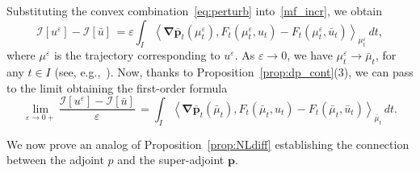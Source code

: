 \documentclass[sn-mathphys-num]{sn-jnl}
\numberwithin{equation}{section}
\theoremstyle{mythm}
\theoremstyle{mydef}
\renewcommand{\epsilon}{\varepsilon}
\renewcommand{\d}{\,d}
\renewcommand{\mathbf}[1]{\bm{#1}}
\begin{document}
Substituting the convex combination~\eqref{eq:perturb} into~\eqref{mf_incr}, we obtain 
\[
 \mathcal{I}[u^\epsilon] - \mathcal{I}[\bar{u}] \, = \epsilon \int_I \left< \bm \nabla \bar{\bm{p}} _t(\mu_t^\epsilon),F_t(\mu_t^\epsilon,u_t)-F_t(\mu_t^\epsilon,\bar{u}_{t})\right>_{\mu_t^\epsilon}\d t,
\]
where \( \mu^\epsilon \) is the trajectory corresponding to \( u^\epsilon \). As \( \epsilon\to 0 \), we have \( \mu^\epsilon_t\to \bar{\mu}_t \), for any \( t\in I \) (see, e.g.,~\cite{pogodaevNonlocalBalanceEquations2022}). 
Now, thanks to Proposition~\ref{prop:dp_cont}(3), we can pass to the limit obtaining the first-order formula
\begin{equation}
  \label{eq:Wfirst-order}
  \lim_{\epsilon\to 0+}\frac{\mathcal{I}[u^\epsilon] - \mathcal{I}[\bar{u}]}{\epsilon} \, = \int_I \left< \bm \nabla \bar{\bm{p}} _t(\bar{\mu}_t),F_t(\bar{\mu}_t,u_t)-F_t(\bar{\mu}_t,\bar{u}_{t})\right>_{\bar{\mu}_t}\d t.
\end{equation}

We now prove an analog of Proposition~\ref{prop:NLdiff} establishing the connection between the adjoint \( p \) and the super-adjoint \( \mathbf{p} \).
\end{document}
